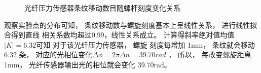 \documentclass[10pt,a4paper,twoside,UTF8]{ctexart}
\begin{document}
\begin{figure}[htbp]
	\centering

	\caption{光纤压力传感器条纹移动数目随螺杆刻度变化关系}
	\label{fig:P}
\end{figure}

观察实验点的分布可知， 条纹移动数与螺旋刻度基本上呈线性关系， 进行线性拟合得到直线
相关系数均超过0.99，线性关系成立。 计算得斜率绝对值均值 $\overline{|K|}=6.32 $可知 对于该光纤压力传感器， 螺旋
刻度每增加 1mm， 条纹就会移动 6.32 条， 对应的光相位变化$\varDelta \phi=2\pi \varDelta n=39.70rad$ ，
所以， 每改变螺旋距离 1mm， 光纤传感器输出光的相位就会变化 39.70rad。
\end{document}
